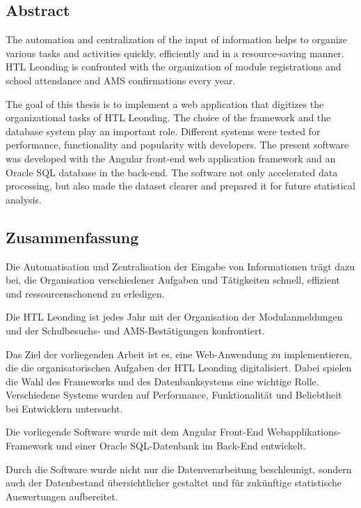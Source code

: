 
\begin{spacing}{1}
    \chapter*{Abstract}
\end{spacing}
The automation and centralization of the input of information helps to organize various tasks and activities quickly,
efficiently and in a resource-saving manner. 
HTL Leonding is confronted with the organization of module registrations and school attendance and AMS confirmations every year. 

The goal of this thesis is to implement a web application that digitizes the organizational tasks of HTL Leonding.
The choice of the framework and the database system play an important role. Different systems were tested for performance,
functionality and popularity with developers. 
The present software was developed with the Angular front-end web application framework and an Oracle SQL database in the back-end. 
The software not only accelerated data processing, but also made the dataset clearer and prepared it for future statistical analysis.

\newpage
\begin{spacing}{1}
    \chapter*{Zusammenfassung}
\end{spacing}
\begin{wrapfigure}{r}{0.3\textwidth}
\end{wrapfigure}

Die Automatisation und Zentralisation der Eingabe von Informationen trägt dazu bei, die Organisation verschiedener Aufgaben und Tätigkeiten schnell,
effizient und ressourcenschonend zu erledigen. 

Die HTL Leonding ist jedes Jahr mit der Organisation der Modulanmeldungen und der Schulbesuchs- und AMS-Bestätigungen konfrontiert. 

Das Ziel der vorliegenden Arbeit ist es, eine Web-Anwendung zu implementieren, die die organisatorischen Aufgaben der HTL Leonding digitalisiert.
Dabei spielen die Wahl des Frameworks und des Datenbanksystems eine wichtige Rolle. Verschiedene Systeme wurden auf Performance, Funktionalität und Beliebtheit bei Entwicklern untersucht. 

Die vorliegende Software wurde mit dem Angular Front-End Webapplikations-Framework und einer Oracle SQL-Datenbank im Back-End entwickelt. 

Durch die Software wurde nicht nur die Datenverarbeitung beschleunigt, sondern auch der Datenbestand übersichtlicher gestaltet und für zukünftige statistische Auswertungen aufbereitet.


